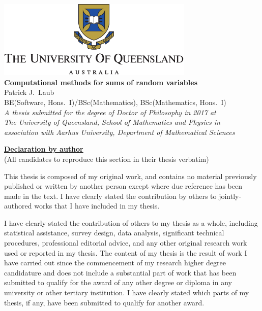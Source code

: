 \begin{titlepage}
\begin{center}
\includegraphics[width=0.70\textwidth]{logo} \\[2cm]

{ \large \bfseries Computational methods for sums of random variables }\\
Patrick J.\ Laub \\
BE(Software, Hons.\ I)/BSc(Mathematics), BSc(Mathematics, Hons.\ I) \\[7cm]
{\em A thesis submitted for the degree of Doctor of Philosophy in 2017 at\\
The University of Queensland, School of Mathematics and Physics in \\
association with
Aarhus University, Department of Mathematical Sciences} \\

\end{center}
\end{titlepage}


\begin{abstract}
  Start this section on a new page.

  The abstract should outline the main approach and findings of the thesis and
  must be between 300 and 800 words.
\end{abstract}

\newpage
{\bf \underline{Declaration by author}} \\
(All candidates to reproduce this section in their thesis verbatim)

This thesis is composed of my original work, and contains no material
previously published or written by another person except where due reference
has been made in the text. I have clearly stated the contribution by others to
jointly-authored works that I have included in my thesis.

I have clearly stated the contribution of others to my thesis as a whole,
including statistical assistance, survey design, data analysis, significant
technical procedures, professional editorial advice, and any other original
research work used or reported in my thesis. The content of my thesis is the
result of work I have carried out since the commencement of my research higher
degree candidature and does not include a substantial part of work that has
been submitted to qualify for the award of any other degree or diploma in any
university or other tertiary institution. I have clearly stated which parts of
my thesis, if any, have been submitted to qualify for another award.

